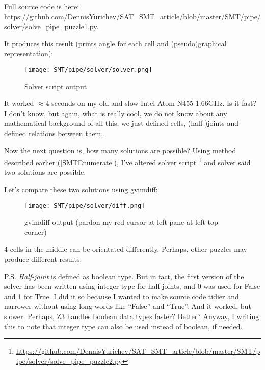 Full source code is here: \url{https://github.com/DennisYurichev/SAT_SMT_article/blob/master/SMT/pipe/solver/solve_pipe_puzzle1.py}.

It produces this result (prints angle for each cell and (pseudo)graphical representation):

\begin{figure}[H]
\centering
\texttt{[image: SMT/pipe/solver/solver.png]}
\caption{Solver script output}
\end{figure}

It worked $\approx 4$ seconds on my old and slow Intel Atom N455 1.66GHz.
Is it fast? I don't know, but again, what is really cool, we do not know about any mathematical background
of all this, we just defined cells, (half-)joints and defined relations between them.

Now the next question is, how many solutions are possible?
Using method described earlier (\ref{SMTEnumerate}), I've altered solver script
\footnote{\url{https://github.com/DennisYurichev/SAT_SMT_article/blob/master/SMT/pipe/solver/solve_pipe_puzzle2.py}} and solver
said two solutions are possible.

Let's compare these two solutions using gvimdiff:

\begin{figure}[H]
\centering
\texttt{[image: SMT/pipe/solver/diff.png]}
\caption{gvimdiff output (pardon my red cursor at left pane at left-top corner)}
\end{figure}

4 cells in the middle can be orientated differently.
Perhaps, other puzzles may produce different results.

P.S.
\textit{Half-joint} is defined as boolean type.
But in fact, the first version of the solver has been written using integer type for half-joints,
and 0 was used for False and 1 for True.
I did it so because I wanted to make source code tidier and narrower without using long words like ``False'' and ``True''.
And it worked, but slower. Perhaps, Z3 handles boolean data types faster? Better?
Anyway, I writing this to note that integer type can also be used instead of boolean, if needed.

